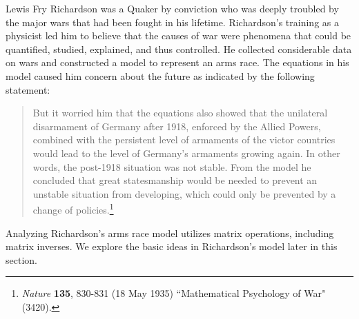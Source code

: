  \label{sec:matrix_inverse}

\vspace*{-17 pt}

\vspace*{13 pt}



Lewis Fry Richardson was a Quaker by conviction who was deeply troubled by the major wars that had been fought in his lifetime. Richardson's training as a physicist led him to believe that the causes of war were phenomena that could be quantified, studied, explained, and thus controlled. He collected considerable data on wars and constructed a model to represent an arms race. The equations in his model caused him concern about the future as indicated by the following statement:  
\begin{quote} But it worried him that the equations also showed that the unilateral disarmament of Germany after 1918, enforced by the Allied Powers, combined with the persistent level of armaments of the victor countries would lead to the level of Germany's armaments growing again. In other words, the post-1918 situation was not stable. From the model he concluded that great statesmanship would be needed to prevent an unstable situation from developing, which could only be prevented by a change of policies.\footnote{\emph{Nature} \textbf{135}, 830-831 (18 May 1935) ``Mathematical Psychology of War" (3420).}
\end{quote}
Analyzing Richardson's arms race model utilizes matrix operations, including matrix inverses. We explore the basic ideas in Richardson's model later in this section. 


